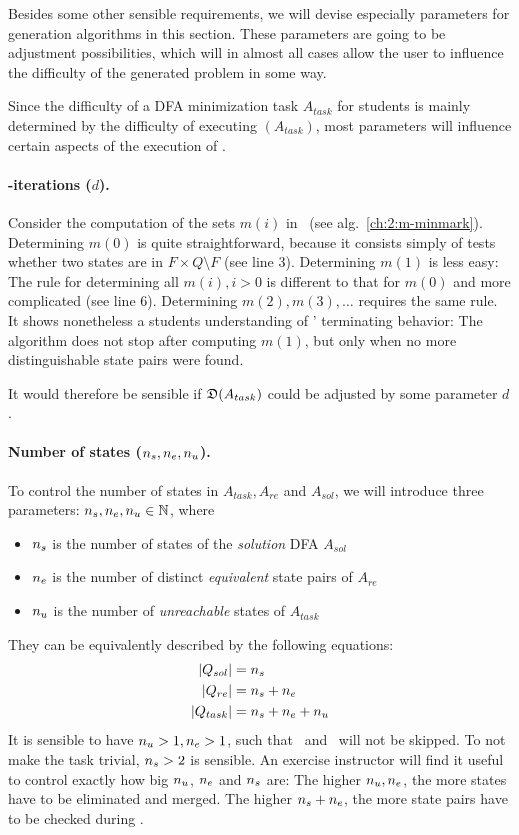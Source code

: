 
Besides some other sensible requirements, we will devise especially parameters for generation algorithms in this section. These parameters are going to be adjustment possibilities, which will in almost all cases allow the user to influence the difficulty of the generated problem in some way.

Since the difficulty of a DFA minimization task $A_{task}$ for students is mainly determined by the difficulty of executing \MinAlg$(A_{task})$, most parameters will influence certain aspects of the execution of \MinAlg.

\paragraph*{\CompDist-iterations ($d$).}

Consider the computation of the sets $m(i)$ in \mCompDist\ (see alg.~\ref{ch:2:m-minmark}). Determining $m(0)$ is quite straightforward, because it consists simply of tests whether two states are in $F \times Q \setminus F$ (see line 3). Determining $m(1)$ is less easy: The rule for determining all $m(i), i > 0$ is different to that for $m(0)$ and more complicated (see line 6). Determining $m(2), m(3), \ldots$ requires the same rule. It shows nonetheless a students understanding of \CompDist' terminating behavior: The algorithm does not stop after computing $m(1)$, but only when no more distinguishable state pairs were found.

It would therefore be sensible if $\mathfrak{D}(A_{task})$ could be adjusted by some parameter $d$.

\paragraph*{Number of states \texorpdfstring{(${n_s}, {n_e}, {n_u}$)}{}.}

To control the number of states in $A_{task}, A_{re}$ and $A_{sol}$, we will introduce three parameters: ${n_s}, {n_e}, {n_u} \in \mathbb{N}$, where
\begin{itemize}
	\item ${n_s}$ is the number of states of the \emph{solution} DFA $A_{sol}$
	\item ${n_e}$ is the number of distinct \emph{equivalent} state pairs of $A_{re}$
	\item ${n_u}$ is the number of \emph{unreachable} states of $A_{task}$
\end{itemize}
They can be equivalently described by the following equations:
\begin{align*}
    |Q_{sol}| &= {n_s} \\
    |Q_{re}| &= {n_s} + {n_e} \\
    |Q_{task}| &= {n_s} + {n_e} + {n_u}
\end{align*}
It is sensible to have ${n_u} > 1, {n_e} > 1$, such that \RemUnr\ and \RemEq\ will not be skipped. To not make the task trivial, ${n_s} > 2$ is sensible. An exercise instructor will find it useful to control exactly how big ${n_u}$, ${n_e}$ and ${n_s}$ are: The higher ${n_u}, {n_e}$, the more states have to be eliminated and merged. The higher ${n_s} + {n_e}$, the more state pairs have to be checked during \CompDist.

